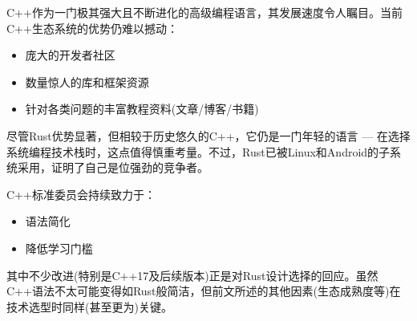 C++作为一门极其强大且不断进化的高级编程语言，其发展速度令人瞩目。当前C++生态系统的优势仍难以撼动：

\begin{itemize}
\item 
庞大的开发者社区

\item 
数量惊人的库和框架资源

\item 
针对各类问题的丰富教程资料(文章/博客/书籍)
\end{itemize}

尽管Rust优势显著，但相较于历史悠久的C++，它仍是一门年轻的语言 --- 在选择系统编程技术栈时，这点值得慎重考量。不过，Rust已被Linux和Android的子系统采用，证明了自己是位强劲的竞争者。

C++标准委员会持续致力于：

\begin{itemize}
\item 
语法简化

\item 
降低学习门槛
\end{itemize}

其中不少改进(特别是C++17及后续版本)正是对Rust设计选择的回应。虽然C++语法不太可能变得如Rust般简洁，但前文所述的其他因素(生态成熟度等)在技术选型时同样(甚至更为)关键。